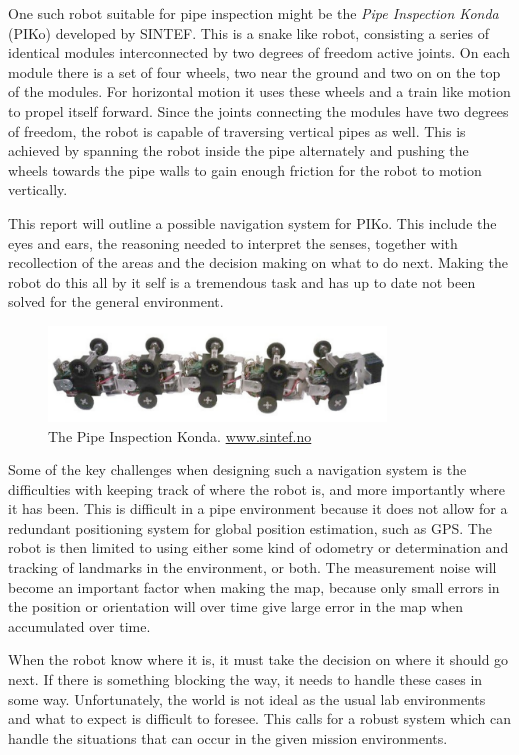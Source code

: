 One such robot suitable for pipe inspection might be the \emph{Pipe Inspection Konda}
(PIKo) developed by SINTEF. This is a snake like robot, consisting a series of identical
modules interconnected by two degrees of freedom active joints. On each module there is a
set of four wheels, two near the ground and two on on the top of the modules. For
horizontal motion it uses these wheels and a train like motion to propel itself forward. Since the joints 
connecting the modules have two degrees of freedom, the robot is capable of traversing vertical pipes
as well. This is achieved by spanning the robot inside the pipe alternately and pushing the wheels towards
the pipe walls to gain enough friction for the robot to motion vertically. \cite{piko}

This report will outline a possible navigation system for PIKo. This include the eyes and
ears, the reasoning needed to interpret the senses, together with recollection of the
areas and the decision making on what to do next. Making the robot do this all by it self
is a tremendous task and has up to date not been solved for the general environment.
\begin{figure}[htbp]
    \centering
    \includegraphics[width=0.8\textwidth]{pics/piko}
    \caption[The Pipe Inspection Konda]{The Pipe Inspection Konda. \url{www.sintef.no}}
    \label{chap1:fig-piko}
\end{figure}

Some of the key challenges when designing such a navigation system is the difficulties
with keeping track of where the robot is, and more importantly where it has been. This is
difficult in a pipe environment because it does not allow for a redundant positioning
system for global position estimation, such as GPS. The robot is then limited to using
either some kind of odometry or determination and tracking of landmarks in the environment, 
or both. The measurement noise will become an important factor when making the map,
because only small errors in the position or orientation will over time give large error
in the map when accumulated over time. \cite{thrun}

When the robot know where it is, it must take the decision on where it should go next. If
there is something blocking the way, it needs to handle these cases in some way.
Unfortunately, the world is not ideal as the usual lab environments and what to expect is
difficult to foresee. 
This calls for a robust system which can handle the situations that can
occur in the given mission environments. 

